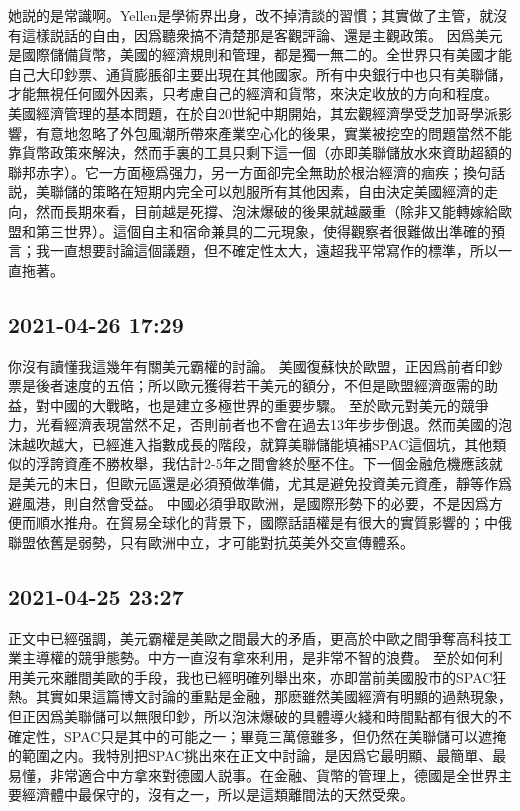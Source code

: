 \documentclass[twocolumn]{ctexart}
\begin{document}
她説的是常識啊。Yellen是學術界出身，改不掉清談的習慣；其實做了主管，就沒有這樣説話的自由，因爲聽衆搞不清楚那是客觀評論、還是主觀政策。
因爲美元是國際儲備貨幣，美國的經濟規則和管理，都是獨一無二的。全世界只有美國才能自己大印鈔票、通貨膨脹卻主要出現在其他國家。所有中央銀行中也只有美聯儲，才能無視任何國外因素，只考慮自己的經濟和貨幣，來決定收放的方向和程度。
美國經濟管理的基本問題，在於自20世紀中期開始，其宏觀經濟學受芝加哥學派影響，有意地忽略了外包風潮所帶來產業空心化的後果，實業被挖空的問題當然不能靠貨幣政策來解決，然而手裏的工具只剩下這一個（亦即美聯儲放水來資助超額的聯邦赤字）。它一方面極爲强力，另一方面卻完全無助於根治經濟的痼疾；換句話説，美聯儲的策略在短期内完全可以剋服所有其他因素，自由決定美國經濟的走向，然而長期來看，目前越是死撐、泡沫爆破的後果就越嚴重（除非又能轉嫁給歐盟和第三世界）。這個自主和宿命兼具的二元現象，使得觀察者很難做出準確的預言；我一直想要討論這個議題，但不確定性太大，遠超我平常寫作的標準，所以一直拖著。
\subsection*{2021-04-26 17:29}

你沒有讀懂我這幾年有關美元霸權的討論。
美國復蘇快於歐盟，正因爲前者印鈔票是後者速度的五倍；所以歐元獲得若干美元的額分，不但是歐盟經濟亟需的助益，對中國的大戰略，也是建立多極世界的重要步驟。
至於歐元對美元的競爭力，光看經濟表現當然不足，否則前者也不會在過去13年步步倒退。然而美國的泡沫越吹越大，已經進入指數成長的階段，就算美聯儲能填補SPAC這個坑，其他類似的浮誇資產不勝枚舉，我估計2-5年之間會終於壓不住。下一個金融危機應該就是美元的末日，但歐元區還是必須預做準備，尤其是避免投資美元資產，靜等作爲避風港，則自然會受益。
中國必須爭取歐洲，是國際形勢下的必要，不是因爲方便而順水推舟。在貿易全球化的背景下，國際話語權是有很大的實質影響的；中俄聯盟依舊是弱勢，只有歐洲中立，才可能對抗英美外交宣傳體系。
\subsection*{2021-04-25 23:27}

正文中已經强調，美元霸權是美歐之間最大的矛盾，更高於中歐之間爭奪高科技工業主導權的競爭態勢。中方一直沒有拿來利用，是非常不智的浪費。
至於如何利用美元來離間美歐的手段，我也已經明確列舉出來，亦即當前美國股市的SPAC狂熱。其實如果這篇博文討論的重點是金融，那麽雖然美國經濟有明顯的過熱現象，但正因爲美聯儲可以無限印鈔，所以泡沫爆破的具體導火綫和時間點都有很大的不確定性，SPAC只是其中的可能之一；畢竟三萬億雖多，但仍然在美聯儲可以遮掩的範圍之内。我特別把SPAC挑出來在正文中討論，是因爲它最明顯、最簡單、最易懂，非常適合中方拿來對德國人説事。在金融、貨幣的管理上，德國是全世界主要經濟體中最保守的，沒有之一，所以是這類離間法的天然受衆。
\end{document}
